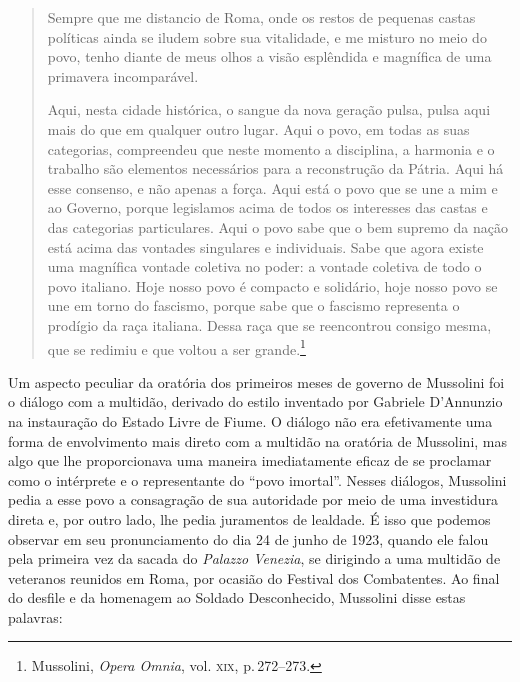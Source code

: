 \begin{quote}
Sempre que me distancio de Roma, onde os restos de pequenas castas
políticas ainda se iludem sobre sua vitalidade, e me misturo no meio do
povo, tenho diante de meus olhos a visão esplêndida e magnífica de uma
primavera incomparável.

Aqui, nesta cidade histórica, o sangue da nova geração pulsa, pulsa aqui
mais do que em qualquer outro lugar. Aqui o povo, em todas as suas
categorias, compreendeu que neste momento a disciplina, a harmonia e o
trabalho são elementos necessários para a reconstrução da Pátria. Aqui
há esse consenso, e não apenas a força. Aqui está o povo que se une a
mim e ao Governo, porque legislamos acima de todos os interesses das
castas e das categorias particulares. Aqui o povo sabe que o bem supremo
da nação está acima das vontades singulares e individuais. Sabe que
agora existe uma magnífica vontade coletiva no poder: a vontade coletiva
de todo o povo italiano. Hoje nosso povo é compacto e solidário, hoje
nosso povo se une em torno do fascismo, porque sabe que o fascismo
representa o prodígio da raça italiana. Dessa raça que se reencontrou
consigo mesma, que se redimiu e que voltou a ser grande.\footnote{Mussolini,
  \emph{Opera Omnia}, vol. \textsc{xix}, p.\,272--273.}
\end{quote}

Um aspecto peculiar da oratória dos primeiros meses de governo de
Mussolini foi o diálogo com a multidão, derivado do estilo inventado por
Gabriele D'Annunzio na instauração do Estado Livre de Fiume. O diálogo
não era efetivamente uma forma de envolvimento mais direto com a
multidão na oratória de Mussolini, mas algo que lhe proporcionava uma
maneira imediatamente eficaz de se proclamar como o intérprete e o
representante do ``povo imortal''. Nesses diálogos, Mussolini pedia a
esse povo a consagração de sua autoridade por meio de uma investidura
direta e, por outro lado, lhe pedia juramentos de lealdade. É isso que
podemos observar em seu pronunciamento do dia 24 de junho de 1923,
quando ele falou pela primeira vez da sacada do \emph{Palazzo Venezia},
se dirigindo a uma multidão de veteranos reunidos em Roma, por ocasião
do Festival dos Combatentes. Ao final do desfile e da homenagem ao
Soldado Desconhecido, Mussolini disse estas palavras:

